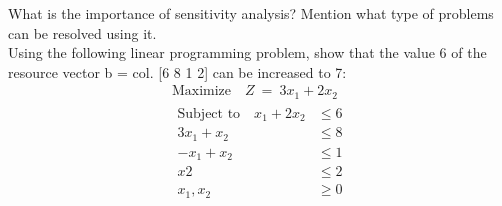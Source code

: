  \myline
  What is the importance of sensitivity analysis? Mention what type of problems can be resolved using it.\\ Using the following linear programming problem, show that the value 6 of the resource vector b = col. [6 8 1 2] can be increased to 7:
 \begin{gather*}
    \text{Maximize} \quad Z \:= \:3x_1 +2x_2  \\
    \begin{aligned}
        \text{Subject to} \quad  x_1 +2x_2 &\leq 6  \\
        3x_1 +  x_2  &\leq 8 \\
        -x_1 + x_2 &\leq 1 \\
        x2&\leq2 \\
        x_1,x_2 &\geq 0
    \end{aligned}
\end{gather*}
